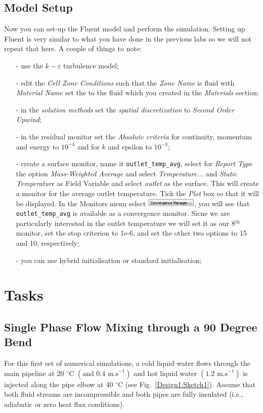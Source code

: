 \documentclass[12pts,a4paper,amsmath,amssymb,floatfix]{article}%
\begin{document}
\subsection{Model Setup}
Now you can set-up the Fluent model and perform the simulation. Setting up Fluent is very similar to what you have done in the previous labs so we will not repeat that here. A couple of things to note:
\begin{itemize}
\item[-] use the $k-\varepsilon$ turbulence model;
\item[-] edit the \emph{Cell Zone Conditions} such that the \emph{Zone Name} is fluid with \emph{Material Name} set the to the fluid which you created in the \emph{Materials} section;
\item[-] in the \emph{solution methods} set the \emph{spatial discretization} to \emph{Second Order Upwind};
\item[-] in the residual monitor set the \emph{Absolute criteria} for continuity, momentum and energy to $10^{-4}$ and for $k$ and epsilon to $10^{-3}$;
\item[-] create a surface monitor, name  it \texttt{outlet\_temp\_avg}, select for \emph{Report Type} the option \emph{Mass-Weighted Average} and select \emph{Temperature...} and \emph{Static Temperature} as Field Variable and select \emph{outlet} as the surface. This will create a monitor for the average outlet temperature. Tick the \emph{Plot} box so that it will be displayed. In the Monitors menu select \includegraphics[width=2.4cm]{./Pics/convergence_manager.png}, you will see that \texttt{outlet\_temp\_avg} is available as a convergence monitor. Sicne we are particularly interested in the outlet temperature we will set it as our 8$^\mathrm{th}$ monitor, set the stop criterion to 1e-6, and set the other two options to 15 and 10, respectively;
\item[-] you can use hybrid initialisation or standard initialisation;
\end{itemize}



\section{Tasks}
\subsection{Single Phase Flow Mixing through a 90 Degree Bend}\label{Task:Section1}
 For this first set of numerical simulations, a cold liquid water flows through the main pipeline at 20 $^{\circ}$C $\left(\text{and 0.4 m.s}^{-1}\right)$ and hot liquid water $\left(\text{1.2 m.s}^{-1}\right)$ is injected along the pipe elbow at 40 $^{\circ}$C (see Fig.~\ref{Design1:Sketch1}). Assume that both fluid streams are incompressible and both pipes are fully insulated (i.e., adiabatic or zero heat flux conditions).
    
\end{document}
